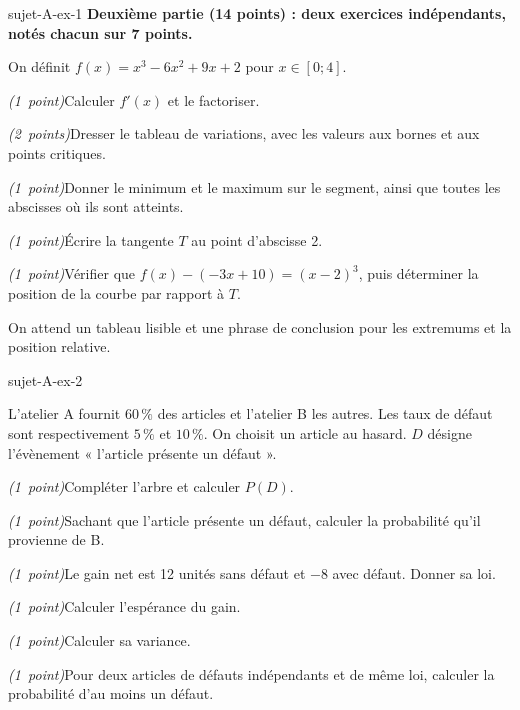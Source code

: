 \begin{blocEdition}{sujet-A-ex-1}
\textbf{Deuxième partie (14 points) : deux exercices indépendants, notés chacun sur 7 points.}
\par\vspace{2mm}
On définit $f(x)=x^3-6x^2+9x+2$ pour $x\in[0;4]$.
\begin{questions}
\item \mbox{\textit{(1 point)}}\enspace Calculer $f'(x)$ et le factoriser.
\item \mbox{\textit{(2 points)}}\enspace Dresser le tableau de variations, avec les valeurs aux bornes et aux points critiques.
\item \mbox{\textit{(1 point)}}\enspace Donner le minimum et le maximum sur le segment, ainsi que toutes les abscisses où ils sont atteints.
\item \mbox{\textit{(1 point)}}\enspace Écrire la tangente $T$ au point d'abscisse 2.
\item \mbox{\textit{(1 point)}}\enspace Vérifier que $f(x)-(-3x+10)=(x-2)^3$, puis déterminer la position de la courbe par rapport à $T$.
\end{questions}
On attend un tableau lisible et une phrase de conclusion pour les extremums et la position relative.

\end{blocEdition}

\begin{blocEdition}{sujet-A-ex-2}

L'atelier A fournit $60\,\%$ des articles et l'atelier B les autres.
Les taux de défaut sont respectivement $5\,\%$ et $10\,\%$.
On choisit un article au hasard. $D$ désigne l'évènement « l'article présente un défaut ».
\begin{questions}
\item \mbox{\textit{(1 point)}}\enspace Compléter l'arbre et calculer $P(D)$.
\item \mbox{\textit{(1 point)}}\enspace Sachant que l'article présente un défaut, calculer la probabilité qu'il provienne de B.
\item \mbox{\textit{(1 point)}}\enspace Le gain net est 12 unités sans défaut et $-8$ avec défaut. Donner sa loi.
\item \mbox{\textit{(1 point)}}\enspace Calculer l'espérance du gain.
\item \mbox{\textit{(1 point)}}\enspace Calculer sa variance.
\item \mbox{\textit{(1 point)}}\enspace Pour deux articles de défauts indépendants et de même loi, calculer la probabilité d'au moins un défaut.
\end{questions}

\label{figedition-sujet-A-ex-2-1}
\end{blocEdition}

